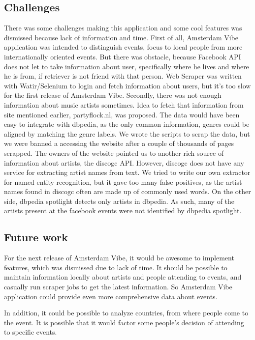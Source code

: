 \documentclass[12pt, a4paper, lithuanian]{article}
\begin{document}
\subsection{Challenges}

  There was some challenges making this application and some cool features was dismissed because lack of information and time. First of all, Amsterdam Vibe application was intended to distinguish events, focus to local people from more internationally oriented events. But there was obstacle, because Facebook API does not let to take information about user, specifically where he lives and where he is from, if retriever is not friend with that person. Web Scraper was written with Watir/Selenium to login and fetch information about users, but it's too slow for the first release of Amsterdam Vibe.
  Secondly, there was not enough information about music artists sometimes. Idea to fetch that information from site mentioned earlier, partyflock.nl, was proposed. The data would have been easy to integrate with dbpedia, as the only common information, genres could be aligned by matching the genre labels. We wrote the scripts to scrap the data, but we were banned a accessing the website after a couple of thousands of pages scrapped. The owners of the website pointed us to another rich source of information about artists, the discogc API. However, discogc does not have any service for extracting artist names from text. We tried to write our own extractor for named entity recognition, but it gave too many false positives, as the artist names found in discogc often are made up of commonly used words. 
 On the other side, dbpedia spotlight detects only artists in dbpedia. As such, many of the artists present at the facebook events were not identified by dbpedia spotlight.

\subsection{Future work}

  For the next release of Amsterdam Vibe, it would be awesome to implement features, which was dismissed due to lack of time. It should be possible to maintain information locally about artists and people attending to events, and casually run scraper jobs to get the latest information. So Amsterdam Vibe application could provide even more comprehensive data about events.

  In addition, it could be possible to analyze countries, from where people come to the event. It is possible that it would factor some people's decision of attending to specific events.
\end{document}

